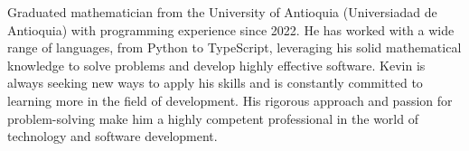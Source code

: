 Graduated mathematician from the University of Antioquia (Universiadad de Antioquia) with programming experience since 2022. He has worked with a wide range of languages, from Python to TypeScript, leveraging his solid mathematical knowledge to solve problems and develop highly effective software. Kevin is always seeking new ways to apply his skills and is constantly committed to learning more in the field of development. His rigorous approach and passion for problem-solving make him a highly competent professional in the world of technology and software development.